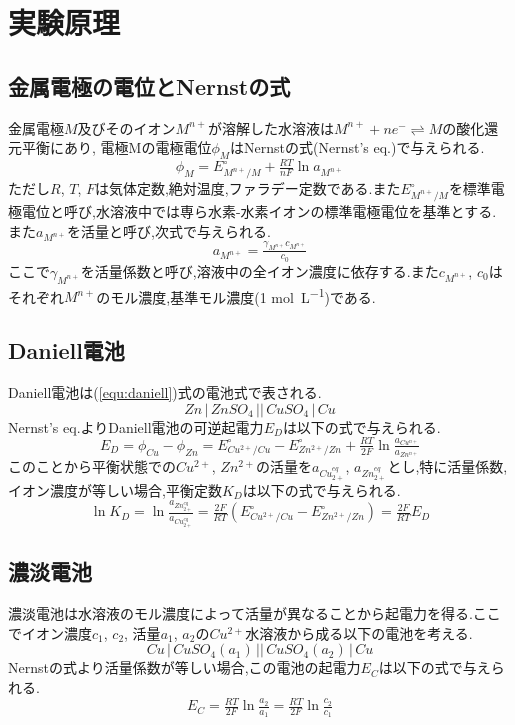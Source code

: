 \section{実験原理}
\subsection{金属電極の電位とNernstの式}
金属電極$M$及びそのイオン$M^{n+}$が溶解した水溶液は$M^{n+}+ne^{-} \rightleftharpoons M$の酸化還元平衡にあり,
電極Mの電極電位$\phi_M$はNernstの式(Nernst's eq.)で与えられる.
\begin{equation}
  \label{equ:nernst}
  \phi_M = E^{\circ}_{M^{n+}/M} + \tfrac{RT}{nF} \ln a_{M^{n+}}
\end{equation}
ただし$R$, $T$, $F$は気体定数,絶対温度,ファラデー定数である.また$E^{\circ}_{M^{n+}/M}$を標準電極電位と呼び,水溶液中では専ら水素-水素イオンの標準電極電位を基準とする.
また$a_{M^{n+}}$を活量と呼び,次式で与えられる.
\begin{equation}
  \label{equ:katuryo}
  a_{M^{n+}}=\tfrac{\gamma_{M^{n+}}c_{M^{n+}}}{c_0}
\end{equation}
ここで$\gamma_{M^{n+}}$を活量係数と呼び,溶液中の全イオン濃度に依存する.また$c_{M^{n+}}$, $c_0$はそれぞれ$M^{n+}$のモル濃度,基準モル濃度(1 \si{\mole.L^{-1}})である.
\subsection{Daniell電池}
Daniell電池は(\ref{equ:daniell})式の電池式で表される.
\begin{equation}
  \label{equ:daniell}
  Zn\,|\,ZnSO_4\,||\,CuSO_4\,|\,Cu
\end{equation}
Nernst's eq.よりDaniell電池の可逆起電力$E_D$は以下の式で与えられる.
\begin{equation}
  \label{equ:ED}
  E_D=\phi_{Cu} - \phi_{Zn}=E^{\circ}_{Cu^{2+}/Cu}-E^{\circ}_{Zn^{2+}/Zn}+\tfrac{RT}{2F} \ln \tfrac{a_{Cu^{n+}}}{a_{Zn^{n+}}}
\end{equation}
このことから平衡状態での$Cu^{2+}$, $Zn^{2+}$の活量を$a_{Cu_{2+}^{eq}}$, $a_{Zn_{2+}^{eq}}$とし,特に活量係数,イオン濃度が等しい場合,平衡定数$K_D$は以下の式で与えられる.
\begin{equation}
  \label{equ:K_D}
  \ln K_D=\ln \tfrac{a_{Zn_{2+}^{eq}}}{a_{Cu_{2+}^{eq}}}=\tfrac{2F}{RT} (E^{\circ}_{Cu^{2+}/Cu} - E^{\circ}_{Zn^{2+}/Zn})=\tfrac{2F}{RT} E_D
\end{equation}
\subsection{濃淡電池}
濃淡電池は水溶液のモル濃度によって活量が異なることから起電力を得る.ここでイオン濃度$c_1$, $c_2$, 活量$a_1$, $a_2$の$Cu^{2+}$水溶液から成る以下の電池を考える.
\begin{equation}
  \label{equ:noutandenti}
  Cu\,|\,CuSO_4(a_1)\,||\,CuSO_4(a_2)\,|\,Cu
\end{equation}
Nernstの式より活量係数が等しい場合,この電池の起電力$E_C$は以下の式で与えられる.
\begin{equation}
  \label{equ:noutan}
  E_C=\tfrac{RT}{2F} \ln \tfrac{a_2}{a_1} = \tfrac{RT}{2F} \ln \tfrac{c_2}{c_1}
\end{equation}
